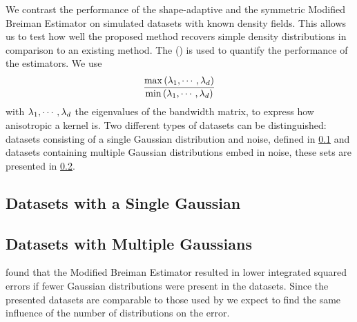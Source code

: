 We contrast the performance of the shape-adaptive and the symmetric Modified Breiman Estimator on simulated datasets with known density fields. This allows us to test how well the proposed method recovers simple density distributions in comparison to an existing method. 
The \mse (\MSE) is used to quantify the performance of the estimators. We use
\begin{equation*}\label{eq:experiment:anisotropicmetric}
	\frac{\max\left(\lambda_1, \cdots, \lambda_d \right)}{\min\left(\lambda_1, \cdots, \lambda_d \right)}
\end{equation*}
with $\lambda_1, \cdots, \lambda_d$ the eigenvalues of the bandwidth matrix, to express how anisotropic a kernel is.
Two different types of datasets can be distinguished: datasets consisting of a single Gaussian distribution and noise, defined in \cref{s:experiment:singlesphere} and datasets containing multiple Gaussian distributions embed in noise, these sets are presented in \cref{s:experiment:multisphere}.

\subsection{Datasets with a Single Gaussian}
\label{s:experiment:singlesphere}


\subsection{Datasets with Multiple Gaussians}
\label{s:experiment:multisphere}


\textcite{ferdosi2011comparison} found that the Modified Breiman Estimator resulted in lower integrated squared errors if fewer Gaussian distributions were present in the datasets. Since the presented datasets are comparable to those used by \citeauthor{ferdosi2011comparison} we expect to find the same influence of the number of distributions on the error.
